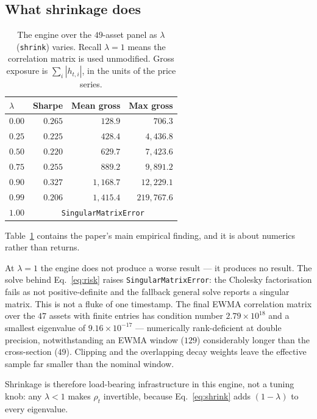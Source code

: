 \documentclass[11pt,a4paper]{article}
\newcommand{\code}[1]{\texttt{#1}}
\begin{document}
\subsection{What shrinkage does}
\label{sec:shrink}

\begin{table}[t]
\centering
\caption{The engine over the $49$-asset panel as $\lambda$ (\code{shrink})
varies. Recall $\lambda = 1$ means the correlation matrix is used unmodified.
Gross exposure is $\sum_i |h_{t,i}|$, in the units of the price series.}
\label{tab:shrink}
\begin{tabular}{lrrr}
\toprule
$\lambda$ & Sharpe & Mean gross & Max gross \\
\midrule
$0.00$ & $0.265$ & $128.9$   & $706.3$ \\
$0.25$ & $0.225$ & $428.4$   & $4{,}436.8$ \\
$0.50$ & $0.220$ & $629.7$   & $7{,}423.6$ \\
$0.75$ & $0.255$ & $889.2$   & $9{,}891.2$ \\
$0.90$ & $0.327$ & $1{,}168.7$ & $12{,}229.1$ \\
$0.99$ & $0.206$ & $1{,}415.4$ & $219{,}767.6$ \\
$1.00$ & \multicolumn{3}{c}{\code{SingularMatrixError}} \\
\bottomrule
\end{tabular}
\end{table}

Table~\ref{tab:shrink} contains the paper's main empirical finding, and it is
about numerics rather than returns.

At $\lambda = 1$ the engine does not produce a worse result --- it produces no
result. The solve behind Eq.~\eqref{eq:risk} raises
\code{SingularMatrixError}: the Cholesky factorisation fails as not
positive-definite and the fallback general solve reports a singular matrix. This
is not a fluke of one timestamp. The final EWMA correlation matrix over the $47$
assets with finite entries has condition number $2.79 \times 10^{18}$ and a
smallest eigenvalue of $9.16 \times 10^{-17}$ --- numerically rank-deficient at
double precision, notwithstanding an EWMA window ($129$) considerably longer
than the cross-section ($49$). Clipping and the overlapping decay weights leave
the effective sample far smaller than the nominal window.

Shrinkage is therefore load-bearing infrastructure in this engine, not a tuning
knob: any $\lambda < 1$ makes $\rho_t$ invertible, because
Eq.~\eqref{eq:shrink} adds $(1-\lambda)$ to every eigenvalue.
\end{document}
